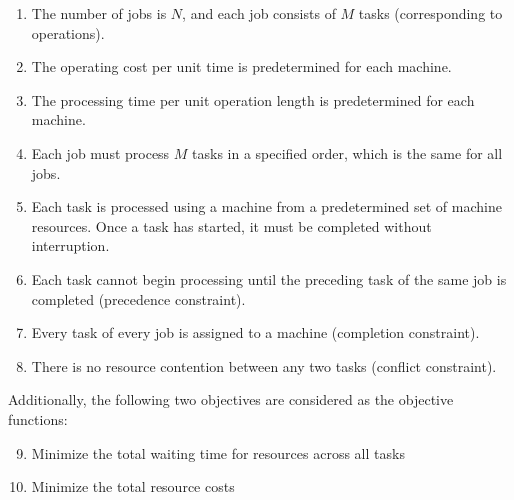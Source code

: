 \documentclass[conference]{IEEEtran}
\begin{document}
\begin{enumerate} 
\item The number of jobs is $N$, and each job consists of $M$ tasks (corresponding to operations). 
\item The operating cost per unit time is predetermined for each machine. 
\item The processing time per unit operation length is predetermined for each machine. 
\item Each job must process $M$ tasks in a specified order, which is the same for all jobs. 
\item Each task is processed using a machine from a predetermined set of machine resources. Once a task has started, it must be completed without interruption. 
\item Each task cannot begin processing until the preceding task of the same job is completed (precedence constraint). 
\item Every task of every job is assigned to a machine (completion constraint). 
\item There is no resource contention between any two tasks (conflict constraint).
 \end{enumerate}
 
Additionally, the following two objectives are considered as the objective functions:

\begin{enumerate} 
\setcounter{enumi}{8} 
\item Minimize the total waiting time for resources across all tasks
\item Minimize the total resource costs
\end{enumerate}





%
\end{document}
